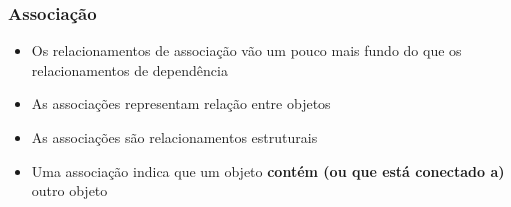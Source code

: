 \documentclass[aspectratio=169]{beamer}
\begin{document}
\begin{frame}\frametitle{Associação}
\begin{itemize}
	\item Os relacionamentos de associação vão um pouco mais fundo do que os relacionamentos de dependência
	\item As associações representam relação entre objetos
	\item As associações são relacionamentos estruturais
	\item Uma associação indica que um objeto \textbf{contém (ou que está conectado a)} outro objeto
\end{itemize}
\end{frame}

\end{document}
